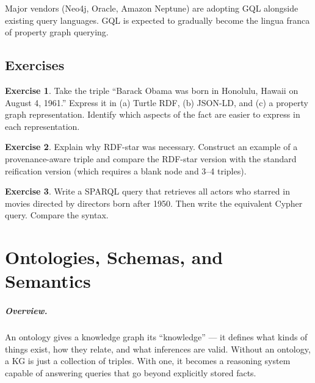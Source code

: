 \documentclass[11pt,a4paper,oneside,openany]{book}
\theoremstyle{definition}
\newtheorem{exercise}{Exercise}[chapter]
\theoremstyle{plain}
\theoremstyle{remark}
\begin{document}
Major vendors (Neo4j, Oracle, Amazon Neptune) are adopting GQL alongside existing query languages. GQL is expected to gradually become the lingua franca of property graph querying.

\section{Exercises}

\begin{exercise}
	Take the triple ``Barack Obama was born in Honolulu, Hawaii on August 4, 1961.'' Express it in (a) Turtle RDF, (b) JSON-LD, and (c) a property graph representation. Identify which aspects of the fact are easier to express in each representation.
\end{exercise}

\begin{exercise}
	Explain why RDF-star was necessary. Construct an example of a provenance-aware triple and compare the RDF-star version with the standard reification version (which requires a blank node and 3--4 triples).
\end{exercise}

\begin{exercise}
	Write a SPARQL query that retrieves all actors who starred in movies directed by directors born after 1950. Then write the equivalent Cypher query. Compare the syntax.
\end{exercise}

\chapter{Ontologies, Schemas, and Semantics}\label{ch:ontologies}

\paragraph{Overview.}
An ontology gives a knowledge graph its ``knowledge'' --- it defines what kinds of things exist, how they relate, and what inferences are valid. Without an ontology, a KG is just a collection of triples. With one, it becomes a reasoning system capable of answering queries that go beyond explicitly stored facts.
\end{document}
